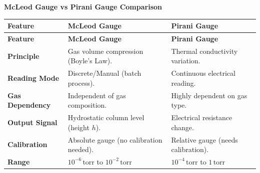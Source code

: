 \documentclass[12pt,a4paper]{article}
\renewcommand{\arraystretch}{1.45}
\begin{document}
\begingroup
\par\smallskip\noindent \textbf{McLeod Gauge vs Pirani Gauge Comparison}\par\nobreak
\renewcommand{\arraystretch}{1.4}
\par\noindent
\begingroup
\setlength{\LTleft}{0pt}
\setlength{\LTright}{0pt}
\begin{longtable}{|B{2.2cm}|>{\small\raggedright\arraybackslash}m{\dimexpr(\linewidth-2.2cm-6\arrayrulewidth)/2\relax}|>{\small\raggedright\arraybackslash}m{\dimexpr(\linewidth-2.2cm-6\arrayrulewidth)/2\relax}|}
\hline
\textbf{Feature} & \textbf{\color{myred}McLeod Gauge} & \textbf{\color{myteal}Pirani Gauge} \\
\hline
\endfirsthead
\hline
\textbf{Feature} & \textbf{\color{myred}McLeod Gauge} & \textbf{\color{myteal}Pirani Gauge} \\
\hline
\endhead
\textbf{Principle} & Gas volume compression (Boyle's Law). & Thermal conductivity variation. \\
\hline
\textbf{Reading Mode} & Discrete/Manual (batch process). & Continuous electrical reading. \\
\hline
\textbf{Gas Dependency} & Independent of gas composition. & Highly dependent on gas type. \\
\hline
\textbf{Output Signal} & Hydrostatic column level (height $h$). & Electrical resistance change. \\
\hline
\textbf{Calibration} & Absolute gauge (no calibration needed). & Relative gauge (needs calibration). \\
\hline
\textbf{Range} & $10^{-6}\,\text{torr}$ to $10^{-2}\,\text{torr}$ & $10^{-4}\,\text{torr}$ to $1\,\text{torr}$ \\
\hline
\end{longtable}
\endgroup
\endgroup
\end{document}
